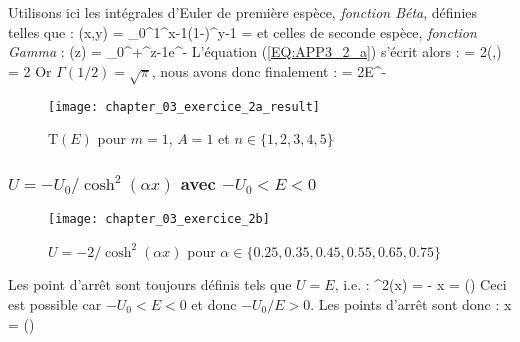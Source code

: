 \ee
Utilisons ici les int\'egrales d'Euler de premi\`ere esp\`ece, \emph{fonction Béta}, d\'efinies telles que :
\be
	(x,y) = \int_{0}^{1}^{x-1}(1-)^{y-1} =  \label{EQ:INT_EULER_BETA}
\ee
et celles de seconde esp\`ece, \emph{fonction Gamma} :
\be
	\Gamma(z) = \int_{0}^{+\infty}^{z-1}e^{-} \label{EQ:INT_EULER_GAMMA}
\ee
L'\'equation (\ref{EQ:APP3_2_a}) s'\'ecrit alors :
\be
	 = 2\left(,\right) = 2 \nonumber
\ee
Or $\Gamma(1/2) = \sqrt{\pi}$, nous avons donc finalement :
\be
	 = 2E^{-} \label{EQ:11_EX2A_1}
\ee

\begin{figure}[htb!]
	\begin{center}
		\texttt{[image: chapter\_03\_exercice\_2a\_result]}
		\caption{$\mathrm{T}(E)$ pour $m=1$, $A=1$ et $n \in \{1,2,3,4,5\}$}\label{FIG:3_2_a_result}
	\end{center}
\end{figure}

\subsubsection{$U = -U_{0}/\cosh^{2}(\alpha x)$ avec $-U_{0} < E < 0$}

\begin{figure}[htb!]
	\begin{center}
		\texttt{[image: chapter\_03\_exercice\_2b]}
		\caption{$U = -2 / \cosh^{2}(\alpha x)$ pour $\alpha \in \{0.25,0.35,0.45,0.55,0.65,0.75\}$}\label{FIG:3_2_b}
	\end{center}
\end{figure}

Les point d'arr\^et sont toujours d\'efinis tels que $U=E$, i.e. :
\be
	\cosh^{2}(\alpha x) = - \Leftrightarrow \alpha x = \pm \arccosh\left(\right)
\ee
Ceci est possible car $-U_{0} < E < 0$ et donc $-U_{0}/E > 0$. Les points d'arr\^et sont donc :
\be
	x = \pm {}\arccosh\left(\right)
\ee

